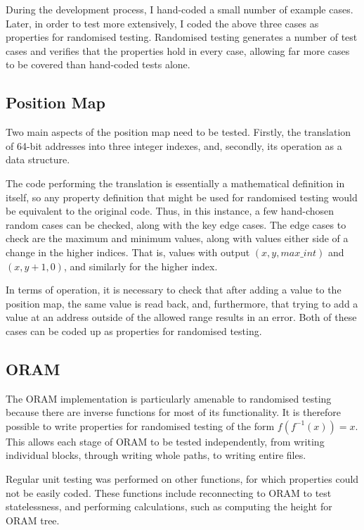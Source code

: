 \documentclass[12pt,a4paper,twoside,openright]{report}
\begin{document}
During the development process, I hand-coded a small number of example cases. Later, in order to test more extensively, I coded the above three cases as properties for randomised testing. Randomised testing generates a number of test cases and verifies that the properties hold in every case, allowing far more cases to be covered than hand-coded tests alone.

\subsection{Position Map}

Two main aspects of the position map need to be tested. Firstly, the translation of 64-bit addresses into three integer indexes, and, secondly, its operation as a data structure.

The code performing the translation is essentially a mathematical definition in itself, so any property definition that might be used for randomised testing would be equivalent to the original code. Thus, in this instance, a few hand-chosen random cases can be checked, along with the key edge cases. The edge cases to check are the maximum and minimum values, along with values either side of a change in the higher indices. That is, values with output $(x,y,max\_int)$ and $(x,y+1,0)$, and similarly for the higher index.

In terms of operation, it is necessary to check that after adding a value to the position map, the same value is read back, and, furthermore, that trying to add a value at an address outside of the allowed range results in an error. Both of these cases can be coded up as properties for randomised testing.

\subsection{ORAM}

The ORAM implementation is particularly amenable to randomised testing because there are inverse functions for most of its functionality. It is therefore possible to write properties for randomised testing of the form $f(f^{-1}(x)) = x$. This allows each stage of ORAM to be tested independently, from writing individual blocks, through writing whole paths, to writing entire files.

Regular unit testing was performed on other functions, for which properties could not be easily coded. These functions include reconnecting to ORAM to test statelessness, and performing calculations, such as computing the height for ORAM tree.
\end{document}
